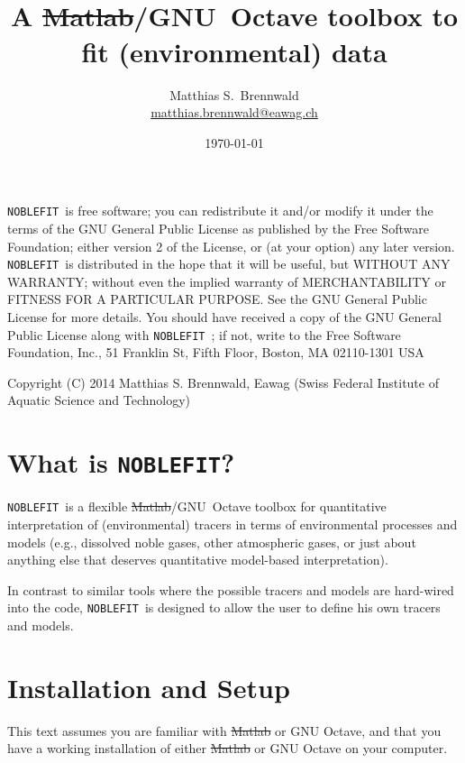 \documentclass[12pt]{article}
\title{\Huge \noblefit\ \\[1ex]
\Large A \sout{Matlab}/\mbox{GNU Octave} toolbox to fit (environmental) data}
\author{Matthias S.\ Brennwald\\ \url{matthias.brennwald@eawag.ch}
}
\date{\today}
\newcommand{\noblefit}{{\tt NOBLEFIT}}
\begin{document}
\maketitle
\tableofcontents \clearpage

\phantom{x}\vfill
{\footnotesize
\noblefit\  is free software; you can redistribute it and/or modify it under the terms of the GNU General Public License as published by the Free Software Foundation; either version 2 of the License, or (at your option) any later version.  \noblefit\  is distributed in the hope that it will be useful, but WITHOUT ANY WARRANTY; without even the implied warranty of MERCHANTABILITY or FITNESS FOR A PARTICULAR PURPOSE.  See the GNU General Public License for more details.  You should have received a copy of the GNU General Public License along with \noblefit\ ; if not, write to the Free Software Foundation, Inc., 51 Franklin St, Fifth Floor, Boston, MA  02110-1301 USA\par
Copyright (C) 2014 Matthias S. Brennwald, Eawag (Swiss Federal Institute of Aquatic Science and Technology)\par
}
\clearpage

\section{What is \noblefit?}
\noblefit\ is a flexible \sout{Matlab}/\mbox{GNU Octave} toolbox for quantitative interpretation of (environmental) tracers in terms of environmental processes and models (e.g., dissolved noble gases, other atmospheric gases, or just about anything else that deserves quantitative model-based interpretation).\par

In contrast to similar tools\citep{Aeschbach:1999} where the possible tracers and models are hard-wired into the code, \noblefit\ is designed to allow the user to define his own tracers and models.

\section{Installation and Setup}
This text assumes you are familiar with \sout{Matlab} or GNU Octave, and that you have a working installation of either \sout{Matlab} or GNU Octave on your computer.
\end{document}
